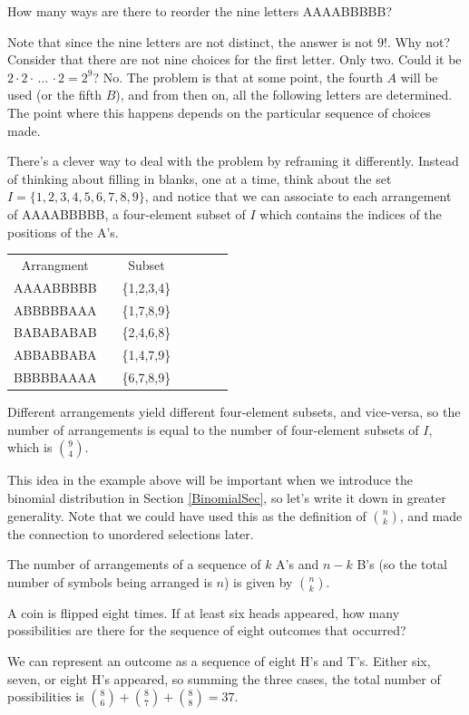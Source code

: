 \begin{example}
How many ways are there to reorder the nine letters AAAABBBBB?

Note that since the nine letters are not distinct, the answer is not $9!$. Why not? Consider that there are not nine choices for the first letter. Only two. Could it be $2\cdot2\cdot \, \dots \, \cdot 2 = 2^9$? No. The problem is that at some point, the fourth $A$ will be used (or the fifth $B$), and from then on, all the following letters are determined. The point where this happens depends on the particular sequence of choices made.

There's a clever way to deal with the problem by reframing it differently. Instead of thinking about filling in blanks, one at a time, think about the set $I = \{1,2,3,4,5,6,7,8,9\}$, and notice that we can associate to each arrangement of AAAABBBBB, a four-element subset of $I$ which contains the indices of the positions of the A's.
\begin{center}
\begin{tabular}{ccccccc}
Arrangment & & Subset \\
AAAABBBBB & &\{1,2,3,4\} \\
ABBBBBAAA & &\{1,7,8,9\} \\
BABABABAB& &\{2,4,6,8\} \\
ABBABBABA & &\{1,4,7,9\} \\
BBBBBAAAA & &\{6,7,8,9\} \\
\end{tabular}
\end{center}

Different arrangements yield different four-element subsets, and vice-versa, so the number of arrangements is equal to the number of four-element subsets of $I$, which is $\binom{9}{4}$.
\end{example}

This idea in the example above will be important when we introduce the binomial distribution in Section \ref{BinomialSec}, so let's write it down in greater generality. Note that we could have used this as the definition of $\binom{n}{k}$, and made the connection to unordered selections later.

\begin{proposition}\label{TwoSymbolCount}
The number of arrangements of a sequence of $k$ A's and $n-k$ B's (so the total number of symbols being arranged is $n$) is given by $\binom{n}{k}$.
\end{proposition}

\begin{example}
A coin is flipped eight times. If at least six heads appeared, how many possibilities are there for the sequence of eight outcomes that occurred?

We can represent an outcome as a sequence of eight H's and T's. Either six, seven, or eight H's appeared, so summing the three cases, the total number of possibilities is $\binom{8}{6}+\binom{8}{7}+\binom{8}{8} = 37$.
\end{example}

